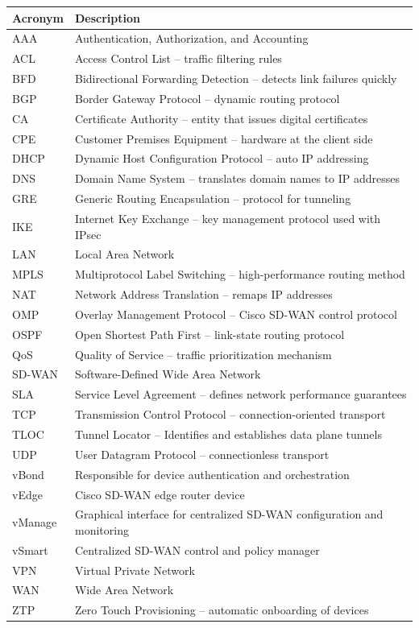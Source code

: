 \documentclass[12pt,english]{report}
\begin{document}
\begin{table}[h!]
\label{tab:sdwan_acronyms}
\begin{tabularx}{\linewidth}{@{}>{\raggedright\arraybackslash}p{3cm}X@{}}
\toprule
\textbf{Acronym} & \textbf{Description} \\
\midrule
AAA & Authentication, Authorization, and Accounting \\
ACL & Access Control List – traffic filtering rules \\
BFD & Bidirectional Forwarding Detection – detects link failures quickly \\
BGP & Border Gateway Protocol – dynamic routing protocol \\
CA & Certificate Authority – entity that issues digital certificates \\
CPE & Customer Premises Equipment – hardware at the client side \\
DHCP & Dynamic Host Configuration Protocol – auto IP addressing \\
DNS & Domain Name System – translates domain names to IP addresses \\
GRE & Generic Routing Encapsulation – protocol for tunneling \\
IKE & Internet Key Exchange – key management protocol used with IPsec \\
LAN & Local Area Network \\
MPLS & Multiprotocol Label Switching – high-performance routing method \\
NAT & Network Address Translation – remaps IP addresses \\
OMP & Overlay Management Protocol – Cisco SD-WAN control protocol \\
OSPF & Open Shortest Path First – link-state routing protocol \\
QoS & Quality of Service – traffic prioritization mechanism \\
SD-WAN & Software-Defined Wide Area Network \\
SLA & Service Level Agreement – defines network performance guarantees \\
TCP & Transmission Control Protocol – connection-oriented transport \\
TLOC & Tunnel Locator – Identifies and establishes data plane tunnels \\
UDP & User Datagram Protocol – connectionless transport \\
vBond & Responsible for device authentication and orchestration \\
vEdge & Cisco SD-WAN edge router device \\
vManage & Graphical interface for centralized SD-WAN configuration and monitoring \\
vSmart & Centralized SD-WAN control and policy manager \\
VPN & Virtual Private Network \\
WAN & Wide Area Network \\
ZTP & Zero Touch Provisioning – automatic onboarding of devices \\
\bottomrule
\end{tabularx}
\end{table}
\end{document}
